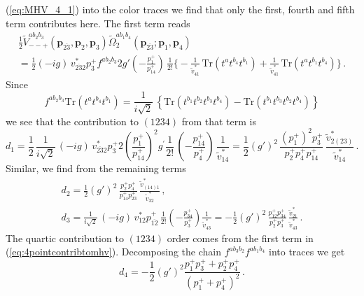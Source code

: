 \documentclass[english,american]{article}
\begin{document}
(\ref{eq:MHV_4_1}) into the color traces we find that only the first,
fourth and fifth term contributes here. The first term reads
\begin{multline}
\frac{1}{2}\tilde{V}_{--+}^{ab_{2}b_{3}}\left(\mathbf{p}_{\overline{23}},\mathbf{p}_{2},\mathbf{p}_{3}\right)\tilde{\Omega}_{2}^{ab_{1}b_{4}}\left(\mathbf{p}_{\overline{23}};\mathbf{p}_{1},\mathbf{p}_{4}\right)\\
=\frac{1}{2}\left(-ig\right)\, v_{\overline{23}2}^{*}p_{3}^{+}f^{ab_{2}b_{3}}2g'\left(-\frac{p_{1}^{+}}{p_{14}^{+}}\right)\,\frac{1}{2!}\Bigg\{-\frac{1}{\tilde{v}_{41}^{*}}\,\mathrm{Tr}\left(t^{a}t^{b_{4}}t^{b_{1}}\right)+\frac{1}{\tilde{v}_{41}^{*}}\,\mathrm{Tr}\left(t^{a}t^{b_{1}}t^{b_{4}}\right)\Bigg\}\,.
\end{multline}
Since
\begin{equation}
f^{ab_{2}b_{3}}\mathrm{Tr}\left(t^{a}t^{b_{4}}t^{b_{1}}\right)=\frac{1}{i\sqrt{2}}\,\left\{ \mathrm{Tr}\left(t^{b_{1}}t^{b_{2}}t^{b_{3}}t^{b_{4}}\right)-\mathrm{Tr}\left(t^{b_{1}}t^{b_{3}}t^{b_{2}}t^{b_{4}}\right)\right\} 
\end{equation}
we see that the contribution to $\left(1234\right)$ from that term
is
\begin{equation}
d_{1}=\frac{1}{2}\,\frac{1}{i\sqrt{2}}\,\left(-ig\right)\, v_{\overline{23}2}^{*}p_{3}^{+}2\left(\frac{p_{1}^{+}}{p_{14}^{+}}\right)^{2}g^{'}\frac{1}{2!}\,\left(-\frac{p_{14}^{+}}{p_{4}^{+}}\right)\,\frac{1}{\tilde{v}_{14}^{*}}=\frac{1}{2}\left(g'\right)^{2}\,\frac{\left(p_{1}^{+}\right)^{2}p_{3}^{+}}{p_{2}^{+}p_{4}^{+}p_{14}^{+}}\,\frac{\tilde{v}_{2\left(23\right)}^{*}}{\tilde{v}_{14}^{*}}\,.
\end{equation}
Similar, we find from the remaining terms
\begin{gather}
d_{2}=\frac{1}{2}\left(g'\right)^{2}\,\frac{p_{2}^{+}p_{4}^{+}}{p_{14}^{+}p_{23}^{+}}\,\frac{\tilde{v}_{\left(14\right)1}^{*}}{\tilde{v}_{32}^{*}}\,,\\
d_{3}=\frac{1}{i\sqrt{2}}\,\left(-ig\right)\, v_{12}^{*}p_{\overline{12}}^{+}\,\frac{1}{2!}\left(-\frac{p_{34}^{+}}{p_{3}^{+}}\right)\frac{1}{\tilde{v}_{43}^{*}}=-\frac{1}{2}\left(g'\right)^{2}\,\frac{p_{12}^{+}p_{34}^{+}}{p_{2}^{+}p_{3}^{+}}\,\frac{\tilde{v}_{21}^{*}}{\tilde{v}_{43}^{*}}\,.
\end{gather}
The quartic contribution to $\left(1234\right)$ order comes from
the first term in (\ref{eq:4pointcontribtomhv}). Decomposing the
chain $f^{ab_{3}b_{2}}f^{ab_{1}b_{4}}$ into traces we get 
\begin{equation}
d_{4}=-\frac{1}{2}\left(g'\right)^{2}\frac{p_{1}^{+}p_{3}^{+}+p_{2}^{+}p_{4}^{+}}{\left(p_{1}^{+}+p_{4}^{+}\right)^{2}}\,.
\end{equation}
\end{document}

